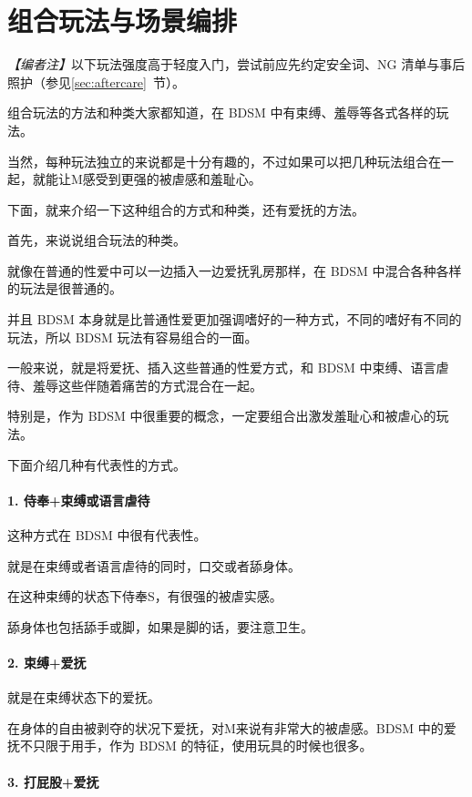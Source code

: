 \documentclass[12pt,UTF8]{ctexbook}
\begin{document}
\section{组合玩法与场景编排}

\noindent\textit{【编者注】}以下玩法强度高于轻度入门，尝试前应先约定安全词、NG 清单与事后照护（参见\ref{sec:aftercare}~节）。

组合玩法的方法和种类大家都知道，在 BDSM 中有束缚、羞辱等各式各样的玩法。

当然，每种玩法独立的来说都是十分有趣的，不过如果可以把几种玩法组合在一起，就能让M感受到更强的被虐感和羞耻心。

下面，就来介绍一下这种组合的方式和种类，还有爱抚的方法。

首先，来说说组合玩法的种类。

就像在普通的性爱中可以一边插入一边爱抚乳房那样，在 BDSM 中混合各种各样的玩法是很普通的。

并且 BDSM 本身就是比普通性爱更加强调嗜好的一种方式，不同的嗜好有不同的玩法，所以 BDSM 玩法有容易组合的一面。

一般来说，就是将爱抚、插入这些普通的性爱方式，和 BDSM 中束缚、语言虐待、羞辱这些伴随着痛苦的方式混合在一起。

特别是，作为 BDSM 中很重要的概念，一定要组合出激发羞耻心和被虐心的玩法。

下面介绍几种有代表性的方式。

\paragraph{1. 侍奉+束缚或语言虐待}

这种方式在 BDSM 中很有代表性。

就是在束缚或者语言虐待的同时，口交或者舔身体。

在这种束缚的状态下侍奉S，有很强的被虐实感。

舔身体也包括舔手或脚，如果是脚的话，要注意卫生。

\paragraph{2. 束缚+爱抚}

就是在束缚状态下的爱抚。

在身体的自由被剥夺的状况下爱抚，对M来说有非常大的被虐感。BDSM 中的爱抚不只限于用手，作为 BDSM 的特征，使用玩具的时候也很多。

\paragraph{3. 打屁股+爱抚}
\end{document}
